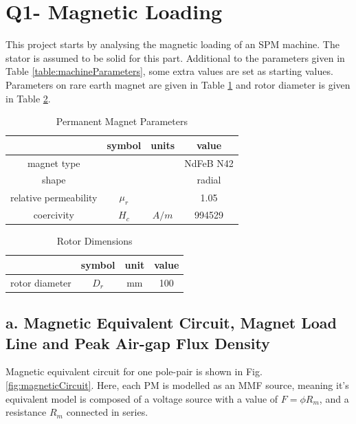 \documentclass[a4paper, 11pt, titlepage]{article}
\begin{document}
\section{Q1- Magnetic Loading}
\label{sec:Q1}

This project starts by analysing the magnetic loading of an SPM machine. The stator is assumed to be solid for this part. Additional to the parameters given in Table \ref{table:machineParameters}, some extra values are set as starting values. Parameters on rare earth magnet are given in Table \ref{fig:PMParameters} and rotor diameter is given in Table \ref{table:rotorParameter}.





\begin{table}[h]
	\begin{center}
		\begin{tabular}{c|c|c|c}
			 & symbol & units & value \\
			\hline
			magnet type & & & NdFeB N42 \\
			shape & & & radial \\ 
			relative permeability & $\mu_r$ & & 1.05 \\
			coercivity & $H_c$ & $A/m$ & 994529 \\
			\hline
		\end{tabular}
	\end{center}
	\caption{Permanent Magnet Parameters}
	\label{fig:PMParameters}
\end{table}


\begin{table}[h]
	\begin{center}
		\begin{tabular}{c|c|c|c}
			 & symbol & unit & value \\
			\hline
			rotor diameter & $D_r$ & mm & 100 \\
			\hline
		\end{tabular}
	\end{center}
	\caption{Rotor Dimensions}
	\label{table:rotorParameter}
\end{table}




\subsection{a. Magnetic Equivalent Circuit, Magnet Load Line and Peak Air-gap Flux Density}
\label{sec:peakAir-gapFluxDensity}

Magnetic equivalent circuit for one pole-pair is shown in Fig. \ref{fig:magneticCircuit}. Here, each PM is modelled as an MMF source, meaning it's equivalent model is composed of a voltage source with a value of $F=\phi R_m$, and a resistance $R_m$ connected in series.
\end{document}
